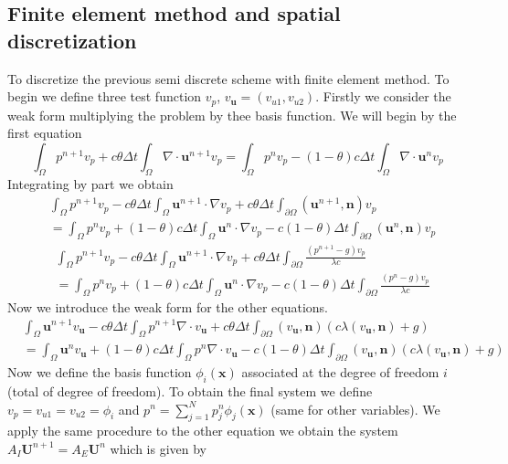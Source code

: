 \documentclass[a4paper,twoside,french,english,11pt]{article}
\begin{document}
\subsection{Finite element method and spatial discretization}
To discretize the previous semi discrete scheme with finite element method. To begin we define three test function $v_p$, $v_{\bm{u}}=(v_{u1},v_{u2})$. Firstly we consider the weak form multiplying the problem by thee basis function. We will begin by the first equation
$$
\int_{\Omega}p^{n+1}v_p+ c\theta\Delta t  \int_{\Omega}\nabla \cdot \mathbf{u}^{n+1}v_p=  \int_{\Omega}p^n v_p- (1-\theta) c\Delta t  \int_{\Omega}\nabla \cdot \mathbf{u}^{n} v_p
$$
Integrating by part we obtain
\begin{align*}
&\int_{\Omega}p^{n+1}v_p -c\theta \Delta t  \int_{\Omega} \mathbf{u}^{n+1}\cdot \nabla v_p+ c\theta\Delta t  \int_{\partial \Omega} (\mathbf{u}^{n+1},\bm{n}) v_p\\
& =  \int_{\Omega}p^n v_p +(1-\theta) c\Delta t  \int_{\Omega}\mathbf{u}^{n} \cdot \nabla v_p -c (1-\theta)\Delta t  \int_{\partial \Omega} (\mathbf{u}^n,\bm{n}) v_p
\end{align*}
\begin{align*}
&\int_{\Omega}p^{n+1}v_p -c\theta\Delta t  \int_{\Omega} \mathbf{u}^{n+1}\cdot \nabla v_p+ c\theta\Delta t  \int_{\partial \Omega} \frac{(p^{n+1}-g) v_p}{\lambda c}\\
& =  \int_{\Omega}p^n v_p +(1-\theta) c\Delta t  \int_{\Omega}\mathbf{u}^{n} \cdot \nabla v_p -c (1-\theta)\Delta t  \int_{\partial \Omega} \frac{(p^n-g) v_p}{\lambda c}
\end{align*}
Now we introduce the weak form for the other equations.
\begin{align*}
&\int_{\Omega}\bm{u}^{n+1}v_{\bm{u}} -c\theta \Delta t \int_{\Omega} p^{n+1}\nabla \cdot v_{\bm{u}}+ c\theta\Delta t  \int_{\partial \Omega} (v_{\bm{u}},\bm{n}) (c\lambda(v_{\bm{u}},\bm{n}) +g)\\
& =  \int_{\Omega}\bm{u}^{n} v_{\bm{u}} +(1-\theta) c\Delta t  \int_{\Omega} p^n\nabla \cdot v_{\bm{u}} -c (1-\theta)\Delta t  \int_{\partial \Omega} (v_{\bm{u}},\bm{n}) (c\lambda(v_{\bm{u}},\bm{n}) +g)
\end{align*}
Now we define the basis function $\phi_i(\mathbf{x})$ associated at the degree of freedom $i$ (total of degree of freedom). To obtain the final system we define $v_p=v_{u1}=v_{u2}=\phi_i$ and $p^n=\sum_{j=1}^N p_j^n \phi_j(\mathbf{x})$ (same for other variables).
We apply the same procedure to the other equation we obtain the system $A_I \mathbf{U}^{n+1}=A_E\mathbf{U}^{n}$ which is given by
\end{document}
